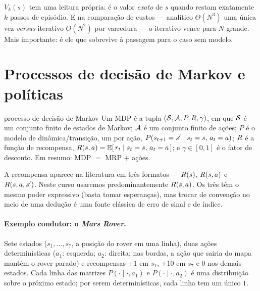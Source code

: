 \documentclass[11pt, a4paper]{article}
\begin{document}
\begin{ideiabox}
$V_k(s)$ tem uma leitura própria: é o valor \emph{exato} de $s$ quando restam exatamente
$k$ passos de episódio. E na comparação de custos --- analítico $\Theta(N^3)$ uma única
vez \emph{versus} iterativo $O(N^2)$ por varredura --- o iterativo vence para $N$ grande.
Mais importante: é ele que sobrevive à passagem para o caso sem modelo.
\end{ideiabox}

\section{Processos de decisão de Markov e políticas}

\begin{defbox}{processo de decisão de Markov}
Um MDP é a tupla $(\mathcal{S}, \mathcal{A}, P, R, \gamma)$, em que $\mathcal{S}$ é um conjunto finito de
estados de Markov; $\mathcal{A}$ é um conjunto finito de ações; $P$ é o modelo de
dinâmica/transição, um por ação, $P(s_{t+1}=s'\mid s_t=s,\, a_t=a)$; $R$ é a função
de recompensa, $R(s,a) = \mathbb{E}[\, r_t \mid s_t = s,\, a_t = a\,]$; e $\gamma \in [0,1]$
é o fator de desconto. Em resumo: MDP $=$ MRP $+$ ações.
\end{defbox}

\begin{alertabox}
A recompensa aparece na literatura em três formatos --- $R(s)$, $R(s,a)$ e
$R(s,a,s')$. Neste curso usaremos predominantemente $R(s,a)$. Os três têm o mesmo
poder expressivo (basta tomar esperanças), mas trocar de convenção no meio de uma
dedução é uma fonte clássica de erro de sinal e de índice.
\end{alertabox}

\paragraph{Exemplo condutor: o \emph{Mars Rover}.} Sete estados ($s_1, \dots, s_7$,
a posição do rover em uma linha), duas ações determinísticas ($a_1$: esquerda; $a_2$:
direita; nas bordas, a ação que sairia do mapa mantém o rover parado) e recompensas
$+1$ em $s_1$, $+10$ em $s_7$ e $0$ nos demais estados. Cada linha das matrizes
$P(\cdot \mid \cdot, a_1)$ e $P(\cdot \mid \cdot, a_2)$ é uma distribuição sobre o
próximo estado; por serem determinísticas, cada linha tem um único $1$.
\end{document}
